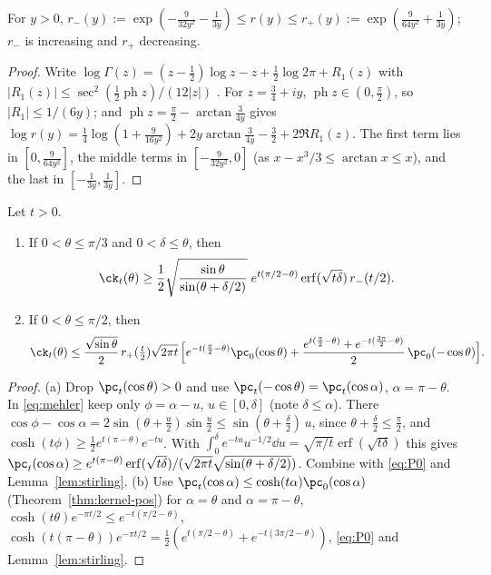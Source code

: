\begin{lemma}\label{lem:stirling}
For $y>0$, $r_-(y):=\exp(-\frac9{32y^2}-\frac1{3y})\le r(y)\le r_+(y):=\exp(\frac9{64y^2}+\frac1{3y})$; $r_-$ is increasing and $r_+$ decreasing.
\end{lemma}

\begin{proof}
Write $\log\Gamma(z)=(z-\frac12)\log z-z+\frac12\log2\pi+R_1(z)$ with $|R_1(z)|\le\sec^2(\frac12\operatorname{ph}z)/(12|z|)$ \cite[\S5.11(ii)]{DLMF}. For
$z=\frac34+iy$, $\operatorname{ph}z\in(0,\frac\pi2)$, so $|R_1|\le1/(6y)$; and $\operatorname{ph}z=\frac\pi2-\arctan\frac3{4y}$ gives
$\log r(y)=\frac14\log(1+\frac9{16y^2})+2y\arctan\frac3{4y}-\frac32+2\Re R_1(z)$. The first term lies in $[0,\frac9{64y^2}]$, the middle terms in
$[-\frac9{32y^2},0]$ (as $x-x^3/3\le\arctan x\le x$), and the last in $[-\frac1{3y},\frac1{3y}]$.
\end{proof}

\begin{lemma}\label{lem:kernel-bounds}
Let $t>0$.
\begin{enumerate}[label=\textup{(\alph*)}]
\item If $0<\theta\le\pi/3$ and $0<\delta\le\theta$, then
\[
\ck_t(\theta)\ge\frac12\sqrt{\frac{\sin\theta}{\sin(\theta+\delta/2)}}\;e^{t(\pi/2-\theta)}\operatorname{erf}(\sqrt{t\delta})\,r_-(t/2).
\]
\item If $0<\theta\le\pi/2$, then
\[
\ck_t(\theta)\le\frac{\sqrt{\sin\theta}}2\,r_+(\tfrac t2)\sqrt{2\pi t}\,\Big[e^{-t(\frac\pi2-\theta)}\pc_0(\cos\theta)+\frac{e^{t(\frac\pi2-\theta)}+e^{-t(\frac{3\pi}2-\theta)}}2\,\pc_0(-\cos\theta)\Big].
\]
\end{enumerate}
\end{lemma}

\begin{proof}
(a) Drop $\pc_t(\cos\theta)>0$ and use $\pc_t(-\cos\theta)=\pc_t(\cos\alpha)$, $\alpha=\pi-\theta$. In \eqref{eq:mehler} keep only $\phi=\alpha-u$, $u\in[0,\delta]$
(note $\delta\le\alpha$). There $\cos\phi-\cos\alpha=2\sin(\theta+\frac u2)\sin\frac u2\le\sin(\theta+\frac\delta2)\,u$, since $\theta+\frac\delta2\le\frac\pi2$, and
$\cosh(t\phi)\ge\frac12e^{t(\pi-\theta)}e^{-tu}$. With $\int_0^\delta e^{-tu}u^{-1/2}\dd u=\sqrt{\pi/t}\operatorname{erf}(\sqrt{t\delta})$ this gives
$\pc_t(\cos\alpha)\ge e^{t(\pi-\theta)}\operatorname{erf}(\sqrt{t\delta})/(\sqrt{2\pi t}\sqrt{\sin(\theta+\delta/2)})$. Combine with \eqref{eq:P0} and
Lemma~\ref{lem:stirling}. (b) Use $\pc_t(\cos\alpha)\le\cosh(t\alpha)\pc_0(\cos\alpha)$ (Theorem~\ref{thm:kernel-pos}) for $\alpha=\theta$ and $\alpha=\pi-\theta$,
$\cosh(t\theta)e^{-\pi t/2}\le e^{-t(\pi/2-\theta)}$, $\cosh(t(\pi-\theta))e^{-\pi t/2}=\frac12(e^{t(\pi/2-\theta)}+e^{-t(3\pi/2-\theta)})$, \eqref{eq:P0} and
Lemma~\ref{lem:stirling}.
\end{proof}

